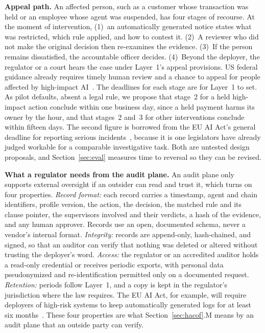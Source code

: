 \documentclass[journal]{IEEEtran}
\begin{document}
\textbf{Appeal path.} An affected person, such as a customer whose transaction was held or an employee whose agent was suspended, has four stages of recourse. At the moment of intervention, (1)~an automatically generated notice states what was restricted, which rule applied, and how to contest it. (2)~A reviewer who did not make the original decision then re-examines the evidence. (3)~If the person remains dissatisfied, the accountable officer decides. (4)~Beyond the deployer, the regulator or a court hears the case under Layer~1's appeal provisions. US federal guidance already requires timely human review and a chance to appeal for people affected by high-impact AI~\cite{omb2025m2521}.
The deadlines for each stage are for Layer~1 to set. As pilot defaults, absent a legal rule, we propose that stage~2 for a held high-impact action conclude within one business day, since a held payment harms its owner by the hour, and that stages~2 and~3 for other interventions conclude within fifteen days. The second figure is borrowed from the EU AI Act's general deadline for reporting serious incidents~\cite{euaiact2024},
because it is one legislators have already judged workable for a comparable investigative task. Both are untested design proposals, and Section~\ref{sec:eval} measures time to reversal so they can be revised.

\textbf{What a regulator needs from the audit plane.} An audit plane only supports external oversight if an outsider can read and trust it, which turns on four properties. \textit{Record format:} each record carries a timestamp, agent and chain identifiers, profile version, the action, the decision, the matched rule and its clause pointer, the supervisors involved and their verdicts, a hash of the evidence, and any human approver. Records use an open, documented schema, never a vendor's internal format. \textit{Integrity:} records are append-only, hash-chained, and signed, so that an auditor can verify that nothing was deleted or altered without trusting the deployer's word. \textit{Access:} the regulator or an accredited auditor holds a read-only credential or receives periodic exports, with personal data pseudonymized and re-identification permitted only on a documented request. \textit{Retention:} periods follow Layer~1, and a copy is kept in the regulator's jurisdiction where the law requires. The EU AI Act, for example, will require deployers of high-risk systems to keep automatically generated logs for at least six months~\cite{euaiact2024,euaiomnibus2026}.
These four properties are what Section~\ref{sec:hacof}.M means by an audit plane that an outside party can verify.
\end{document}
